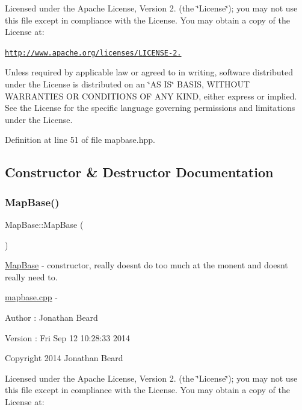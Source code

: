 Licensed under the Apache License, Version 2. (the \char`\"{}\+License\char`\"{}); you may not use this file except in compliance with the License. You may obtain a copy of the License at\+:

\href{http://www.apache.org/licenses/LICENSE-2.0}{\tt http\+://www.\+apache.\+org/licenses/\+L\+I\+C\+E\+N\+S\+E-\/2.}

Unless required by applicable law or agreed to in writing, software distributed under the License is distributed on an \char`\"{}\+A\+S I\+S\char`\"{} B\+A\+S\+IS, W\+I\+T\+H\+O\+UT W\+A\+R\+R\+A\+N\+T\+I\+ES OR C\+O\+N\+D\+I\+T\+I\+O\+NS OF A\+NY K\+I\+ND, either express or implied. See the License for the specific language governing permissions and limitations under the License. 

Definition at line 51 of file mapbase.\+hpp.



\subsection{Constructor \& Destructor Documentation}
\hypertarget{class_map_base_a5a923d5b3ececb0407aa934d967ab7b1}{}\label{class_map_base_a5a923d5b3ececb0407aa934d967ab7b1} 
\subsubsection{\texorpdfstring{Map\+Base()}{MapBase()}}
{\footnotesize\ttfamily Map\+Base\+::\+Map\+Base (\begin{DoxyParamCaption}{ }\end{DoxyParamCaption})}

\hyperlink{class_map_base}{Map\+Base} -\/ constructor, really doesn\textquotesingle{}t do too much at the monent and doesn\textquotesingle{}t really need to.

\hyperlink{mapbase_8cpp_source}{mapbase.\+cpp} -\/ \begin{DoxyAuthor}{Author}
\+: Jonathan Beard 
\end{DoxyAuthor}
\begin{DoxyVersion}{Version}
\+: Fri Sep 12 10\+:28\+:33 2014
\end{DoxyVersion}
Copyright 2014 Jonathan Beard

Licensed under the Apache License, Version 2. (the \char`\"{}\+License\char`\"{}); you may not use this file except in compliance with the License. You may obtain a copy of the License at\+:

